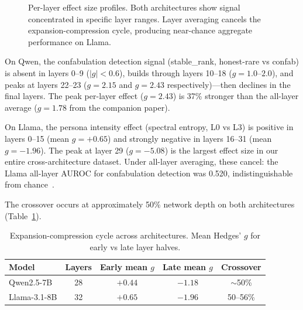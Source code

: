 \documentclass[11pt,a4paper]{article}
\begin{document}
\begin{figure}[ht]
\centering
\caption{Per-layer effect size profiles. Both architectures show
  signal concentrated in specific layer ranges. Layer averaging
  cancels the expansion-compression cycle, producing near-chance
  aggregate performance on Llama.}
\label{fig:perlayer}
\end{figure}

On Qwen, the confabulation detection signal (stable\_rank, honest-rare
vs confab) is absent in layers 0--9 ($|g| < 0.6$), builds through
layers 10--18 ($g = 1.0$--$2.0$), and peaks at layers 22--23
($g = 2.15$ and $g = 2.43$ respectively)---then declines in the final
layers. The peak per-layer effect ($g = 2.43$) is 37\% stronger than
the all-layer average ($g = 1.78$ from the companion paper).

On Llama, the persona intensity effect (spectral entropy, L0 vs L3)
is positive in layers 0--15 (mean $g = +0.65$) and strongly negative
in layers 16--31 (mean $g = -1.96$). The peak at layer 29
($g = -5.08$) is the largest effect size in our entire
cross-architecture dataset. Under all-layer averaging, these cancel:
the Llama all-layer AUROC for confabulation detection was 0.520,
indistinguishable from chance~\citep{lyra_spectral}.

The crossover occurs at approximately 50\% network depth on both
architectures (Table~\ref{tab:cycle}).

\begin{table}[ht]
\centering
\caption{Expansion-compression cycle across architectures. Mean
  Hedges' $g$ for early vs late layer halves.}
\label{tab:cycle}
\begin{tabular}{lcccc}
\toprule
\textbf{Model} & \textbf{Layers} & \textbf{Early mean $g$} & \textbf{Late mean $g$} & \textbf{Crossover} \\
\midrule
Qwen2.5-7B & 28 & $+0.44$ & $-1.18$ & $\sim$50\% \\
Llama-3.1-8B & 32 & $+0.65$ & $-1.96$ & 50--56\% \\
\bottomrule
\end{tabular}
\end{table}
\end{document}

